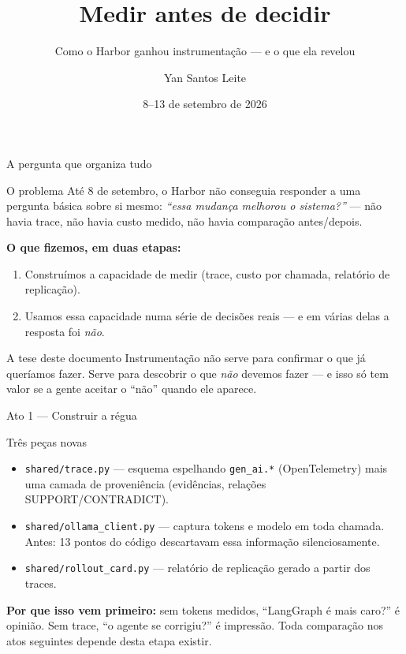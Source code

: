 \documentclass{beamer}
\title{Medir antes de decidir}
\subtitle{Como o Harbor ganhou instrumentação --- e o que ela revelou}
\author{Yan Santos Leite}
\date{8--13 de setembro de 2026}
\newenvironment{numerobloco}[1]{\begin{block}{#1}}{\end{block}}
\newenvironment{decisaobloco}[1]{\begin{alertblock}{#1}}{\end{alertblock}}
\begin{document}
\frame{\titlepage}

\begin{frame}{A pergunta que organiza tudo}
  \begin{numerobloco}{O problema}
    Até 8 de setembro, o Harbor não conseguia responder a uma pergunta básica sobre si
    mesmo: \emph{``essa mudança melhorou o sistema?''} --- não havia trace, não havia
    custo medido, não havia comparação antes/depois.
  \end{numerobloco}

  \pause
  \textbf{O que fizemos, em duas etapas:}
  \begin{enumerate}
    \item Construímos a capacidade de medir (trace, custo por chamada, relatório de
      replicação).
    \item Usamos essa capacidade numa série de decisões reais --- e em \alert{várias
      delas} a resposta foi \emph{não}.
  \end{enumerate}

  \pause
  \begin{decisaobloco}{A tese deste documento}
    Instrumentação não serve para confirmar o que já queríamos fazer. Serve para
    descobrir o que \emph{não} devemos fazer --- e isso só tem valor se a gente aceitar
    o ``não'' quando ele aparece.
  \end{decisaobloco}
\end{frame}

\begin{frame}{Ato 1 --- Construir a régua}
  \small
  \begin{numerobloco}{Três peças novas}
    \begin{itemize}
      \item \texttt{shared/trace.py} --- esquema espelhando \texttt{gen\_ai.*}
        (OpenTelemetry) mais uma camada de proveniência (evidências, relações
        SUPPORT/CONTRADICT).
      \item \texttt{shared/ollama\_client.py} --- captura tokens e modelo em toda
        chamada. Antes: 13 pontos do código descartavam essa informação silenciosamente.
      \item \texttt{shared/rollout\_card.py} --- relatório de replicação gerado a partir
        dos traces.
    \end{itemize}
  \end{numerobloco}

  \pause
  \textbf{Por que isso vem primeiro:} sem tokens medidos, ``LangGraph é mais caro?'' é
  opinião. Sem trace, ``o agente se corrigiu?'' é impressão. Toda comparação nos atos
  seguintes depende desta etapa existir.
\end{frame}
\end{document}
